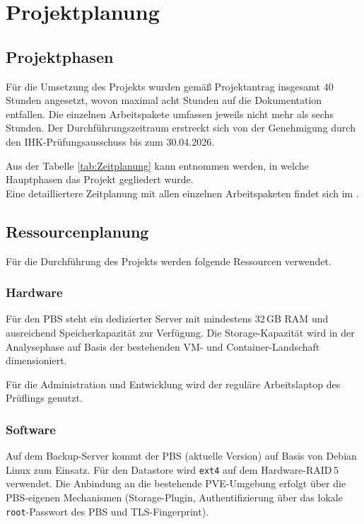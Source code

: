 \section{Projektplanung}
\label{sec:Projektplanung}


\subsection{Projektphasen}
\label{sec:Projektphasen}

Für die Umsetzung des Projekts wurden gemäß Projektantrag insgesamt 40
Stunden angesetzt, wovon maximal acht Stunden auf die Dokumentation
entfallen.
Die einzelnen Arbeitspakete umfassen jeweils nicht mehr als sechs
Stunden.
Der Durchführungszeitraum erstreckt sich von der Genehmigung durch den
IHK-Prüfungsausschuss bis zum 30.04.2026.

Aus der Tabelle \ref{tab:Zeitplanung} kann entnommen werden, in welche
Hauptphasen das Projekt gegliedert wurde.
\\
Eine detailliertere Zeitplanung mit allen einzelnen Arbeitspaketen findet
sich im .



\subsection{Ressourcenplanung}
\label{sec:Ressourcenplanung}

Für die Durchführung des Projekts werden folgende Ressourcen verwendet.

\subsubsection{Hardware}
Für den \ac{PBS} steht ein dedizierter Server mit mindestens 32\,GB
\ac{RAM} und ausreichend Speicherkapazität zur Verfügung.
Die Storage-Kapazität wird in der Analysephase auf Basis der
bestehenden \ac{VM}- und Container-Landschaft dimensioniert.

Für die Administration und Entwicklung wird der reguläre
Arbeitslaptop des Prüflings genutzt.

\subsubsection{Software}
Auf dem Backup-Server kommt der \ac{PBS} (aktuelle Version) auf Basis von
Debian Linux zum Einsatz.
Für den Datastore wird \texttt{ext4} auf dem Hardware-\ac{RAID}\,5
verwendet.
Die Anbindung an die bestehende \ac{PVE}-Umgebung erfolgt über die
\ac{PBS}-eigenen Mechanismen (Storage-Plugin, Authentifizierung über
das lokale \texttt{root}-Passwort des \ac{PBS} und TLS-Fingerprint).

